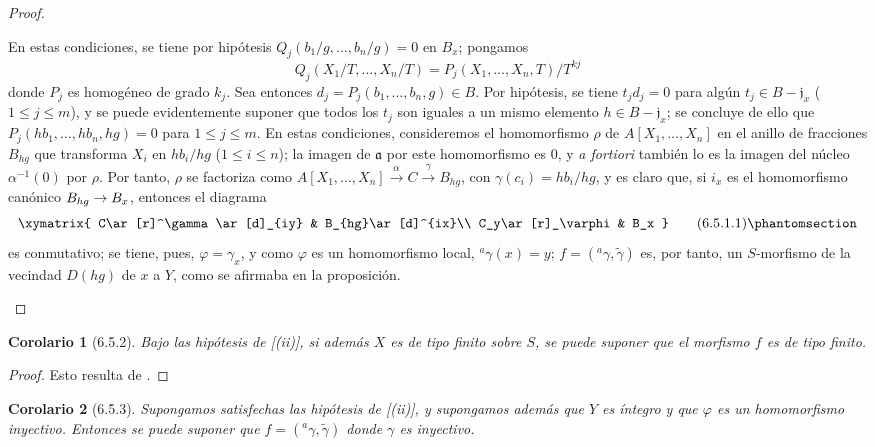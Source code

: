 \documentclass[oneside]{amsart}
\theoremstyle{ega-env-style}
\theoremstyle{ega-thm-env-style}
\newtheorem*{corollary}{Corolario}
\theoremstyle{ega-defn-env-style}
\def\leq{\leqslant}                 %
\def\setmin{-}                      %
\renewcommand{\to}{\mathchoice{\longrightarrow}{\rightarrow}{\rightarrow}{\rightarrow}}
\newcommand{\oldpage}[2][]{{\marginnote{\normalfont{\textbf{#1}~|~#2}}}\ignorespaces}
\let\EGAOriginalLabel\label
\renewcommand{\label}[1]{\phantomsection\EGAOriginalLabel{#1}}
\begin{document}
\begin{proof}
\begin{enumerate}
    En estas condiciones, se tiene por hipótesis $Q_j(b_1/g,\ldots,b_n/g)=0$ en $B_x$; pongamos
    \[
      Q_j(X_1/T,\ldots,X_n/T)
      =P_j(X_1,\ldots,X_n,T)/T^{kj}
    \]
    donde $P_j$ es homogéneo de grado $k_j$.
    Sea entonces $d_j=P_j(b_1,\ldots,b_n,g)\in B$.
    Por hipótesis, se tiene $t_jd_j=0$ para algún $t_j\in B\setmin\mathfrak{j}_x$ ($1\leq j\leq m$), y se puede evidentemente suponer que todos los $t_j$
\oldpage[I]{151}
    son iguales a un mismo elemento $h\in B\setmin\mathfrak{j}_x$;
    se concluye de ello que $P_j(hb_1,\ldots,hb_n,hg)=0$ para $1\leq j\leq m$.
    En estas condiciones, consideremos el homomorfismo $\rho$ de $A[X_1,\ldots,X_n]$ en el anillo de fracciones $B_{hg}$ que transforma $X_i$ en $hb_i/hg$ ($1\leq i\leq n$);
    la imagen de $\mathfrak{a}$ por este homomorfismo es 0, y \emph{a fortiori} también lo es la imagen del núcleo $\alpha^{-1}(0)$ por $\rho$.
    Por tanto, $\rho$ se factoriza como $A[X_1,\ldots,X_n]\xrightarrow{\alpha}C\xrightarrow{\gamma}B_{hg}$, con $\gamma(c_i)=hb_i/hg$, y es claro que, si $i_x$ es el homomorfismo canónico $B_{hg}\to B_x$, entonces el diagrama
    \[
      \xymatrix{
        C\ar[r]^\gamma\ar[d]_{iy} & B_{hg}\ar[d]^{ix}\\
        C_y\ar[r]_\varphi & B_x
      }
      \tag{6.5.1.1}\label{I.6.5.1.1-fr}
    \]
    es conmutativo; se tiene, pues, $\varphi=\gamma_x$, y como $\varphi$ es un homomorfismo local, ${}^a\gamma(x)=y$;
    $f=({}^a\gamma,\widetilde{\gamma})$ es, por tanto, un $S$-morfismo de la vecindad $D(hg)$ de $x$ a $Y$, como se afirmaba en la proposición.
\end{enumerate}
\end{proof}

\begin{corollary}[6.5.2]
\label{I.6.5.2}
Bajo las hipótesis de [(ii)], si además $X$ es de tipo finito sobre $S$, se puede suponer que el morfismo $f$ es de tipo finito.
\end{corollary}

\begin{proof}
Esto resulta de .
\end{proof}

\begin{corollary}[6.5.3]
\label{I.6.5.3}
Supongamos satisfechas las hipótesis de [(ii)], y supongamos además que $Y$ es íntegro y que $\varphi$ es un homomorfismo inyectivo.
Entonces se puede suponer que $f=({}^a\gamma,\widetilde{\gamma})$ donde $\gamma$ es inyectivo.
\end{corollary}
\end{document}

